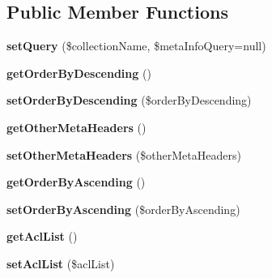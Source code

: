 \subsection*{Public Member Functions}
\begin{DoxyCompactItemize}
\item 
\hypertarget{class_app42_service_a836e00fd26588368851502a8b45bc44d}{{\bfseries set\+Query} (\$collection\+Name, \$meta\+Info\+Query=null)}\label{class_app42_service_a836e00fd26588368851502a8b45bc44d}

\item 
\hypertarget{class_app42_service_a5387ea261580d42d0bd7ff6b5ba73d59}{{\bfseries get\+Order\+By\+Descending} ()}\label{class_app42_service_a5387ea261580d42d0bd7ff6b5ba73d59}

\item 
\hypertarget{class_app42_service_ab02b9620cf97db9b17adb5f50f32c318}{{\bfseries set\+Order\+By\+Descending} (\$order\+By\+Descending)}\label{class_app42_service_ab02b9620cf97db9b17adb5f50f32c318}

\item 
\hypertarget{class_app42_service_aa9780762b2d514b53b7ff94bdd723877}{{\bfseries get\+Other\+Meta\+Headers} ()}\label{class_app42_service_aa9780762b2d514b53b7ff94bdd723877}

\item 
\hypertarget{class_app42_service_a29d8e841ac3232d287b8b320de2d11b5}{{\bfseries set\+Other\+Meta\+Headers} (\$other\+Meta\+Headers)}\label{class_app42_service_a29d8e841ac3232d287b8b320de2d11b5}

\item 
\hypertarget{class_app42_service_a9d51c3e492b21f3f95d9442dd766f939}{{\bfseries get\+Order\+By\+Ascending} ()}\label{class_app42_service_a9d51c3e492b21f3f95d9442dd766f939}

\item 
\hypertarget{class_app42_service_ad444c00f139d367ddce8d231cb835b17}{{\bfseries set\+Order\+By\+Ascending} (\$order\+By\+Ascending)}\label{class_app42_service_ad444c00f139d367ddce8d231cb835b17}

\item 
\hypertarget{class_app42_service_a296b676f6eddba8991e92500d9f10dcf}{{\bfseries get\+Acl\+List} ()}\label{class_app42_service_a296b676f6eddba8991e92500d9f10dcf}

\item 
\hypertarget{class_app42_service_a62e5f07db8dc3dd2834e1f965c3aa46c}{{\bfseries set\+Acl\+List} (\$acl\+List)}\label{class_app42_service_a62e5f07db8dc3dd2834e1f965c3aa46c}


\end{DoxyCompactItemize}
